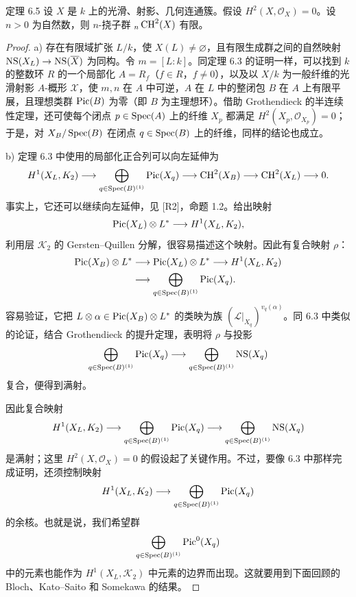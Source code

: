 \begin{statement}{定理 6.5}
设 $X$ 是 $k$ 上的光滑、射影、几何连通簇。假设 $H^2(X,\mathcal O_X)=0$。设 $n>0$ 为自然数，则 $n$-挠子群 ${}_n\operatorname{CH}^2(X)$ 有限。
\end{statement}
\begin{proof}
 a) 存在有限域扩张 $L/k$，使 $X(L)\ne\varnothing$，且有限生成群之间的自然映射 $\operatorname{NS}(X_L)\to\operatorname{NS}(\overline X)$ 为同构。令 $m=[L:k]$。同定理 6.3 的证明一样，可以找到 $k$ 的整数环 $R$ 的一个局部化 $A=R_f$（$f\in R$，$f\ne0$），以及以 $X/k$ 为一般纤维的光滑射影 $A$-概形 $\mathcal X$，使 $m,n$ 在 $A$ 中可逆，$A$ 在 $L$ 中的整闭包 $B$ 在 $A$ 上有限平展，且理想类群 $\operatorname{Pic}(B)$ 为零（即 $B$ 为主理想环）。借助 Grothendieck 的半连续性定理，还可使每个闭点 $p\in\operatorname{Spec}(A)$ 上的纤维 $X_p$ 都满足 $H^2(X_p,\mathcal O_{X_p})=0$；于是，对 $X_B/\operatorname{Spec}(B)$ 在闭点 $q\in\operatorname{Spec}(B)$ 上的纤维，同样的结论也成立。

b) 定理 6.3 中使用的局部化正合列可以向左延伸为
\[
 H^1(X_L,K_2)\longrightarrow
 \bigoplus_{q\in\operatorname{Spec}(B)^{(1)}}\operatorname{Pic}(X_q)
 \longrightarrow\operatorname{CH}^2(X_B)
 \longrightarrow\operatorname{CH}^2(X_L)\longrightarrow0.
\]
事实上，它还可以继续向左延伸，见 [R2]，命题 1.2。给出映射
\[
 \operatorname{Pic}(X_L)\otimes L^*\longrightarrow H^1(X_L,K_2),
\]
利用层 $\mathcal K_2$ 的 Gersten--Quillen 分解，很容易描述这个映射。因此有复合映射 $\rho$：
\[
\begin{split}
 \operatorname{Pic}(X_B)\otimes L^*
 &\longrightarrow\operatorname{Pic}(X_L)\otimes L^*
 \longrightarrow H^1(X_L,K_2)\\
 &\longrightarrow\bigoplus_{q\in\operatorname{Spec}(B)^{(1)}}\operatorname{Pic}(X_q).
\end{split}
\]
容易验证，它把 $L\otimes\alpha\in\operatorname{Pic}(X_B)\otimes L^*$ 的类映为族 $(\mathcal L|_{X_q})^{v_q(\alpha)}$。同 6.3 中类似的论证，结合 Grothendieck 的提升定理，表明将 $\rho$ 与投影
\[
 \bigoplus_{q\in\operatorname{Spec}(B)^{(1)}}\operatorname{Pic}(X_q)
 \longrightarrow\bigoplus_{q\in\operatorname{Spec}(B)^{(1)}}\operatorname{NS}(X_q)
\]
复合，便得到满射。

因此复合映射
\[
 H^1(X_L,K_2)\longrightarrow
 \bigoplus_{q\in\operatorname{Spec}(B)^{(1)}}\operatorname{Pic}(X_q)
 \longrightarrow\bigoplus_{q\in\operatorname{Spec}(B)^{(1)}}\operatorname{NS}(X_q)
\]
是满射；这里 $H^2(X,\mathcal O_X)=0$ 的假设起了关键作用。不过，要像 6.3 中那样完成证明，还须控制映射
\[
 H^1(X_L,K_2)\longrightarrow
 \bigoplus_{q\in\operatorname{Spec}(B)^{(1)}}\operatorname{Pic}(X_q)
\]
的余核。也就是说，我们希望群
\[
 \bigoplus_{q\in\operatorname{Spec}(B)^{(1)}}\operatorname{Pic}^0(X_q)
\]
中的元素也能作为 $H^1(X_L,\mathcal K_2)$ 中元素的边界而出现。这就要用到下面回顾的 Bloch、Kato--Saito 和 Somekawa 的结果。


\end{proof}
